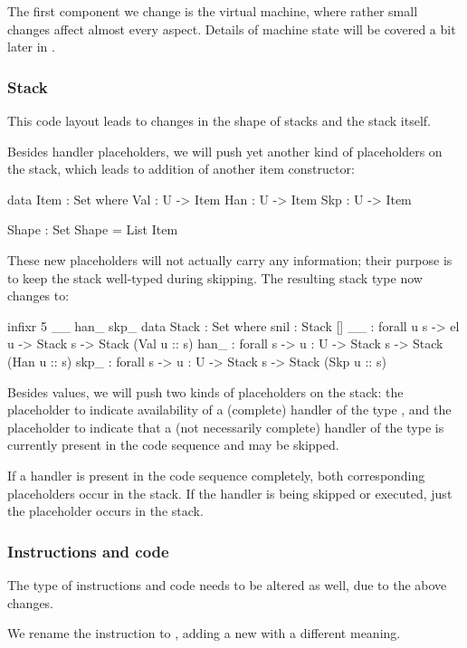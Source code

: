 The first component we change is the virtual machine, where rather small
changes affect almost every aspect. Details of machine state will be covered
a bit later in .

\subsubsection{Stack}

This code layout leads to changes in the shape of stacks and the stack itself.

Besides handler placeholders, we will push yet another kind of placeholders on
the stack, which leads to addition of another item constructor:
\begin{code}
  data Item : Set where
    Val : U -> Item
    Han : U -> Item
    Skp : U -> Item

  Shape : Set
  Shape = List Item
\end{code}
\noindent These new placeholders will not actually carry any information; their
purpose is to keep the stack well-typed during skipping. The resulting stack type
now changes to:
\begin{code}
  infixr 5 _\scons\_ han\scons\_ skp\scons\_
  data Stack : Set where
    snil : Stack []
    _\scons\_ : forall {u s} -> el u -> Stack s -> Stack (Val u :: s)
    han\scons\_ : forall {s} -> {u : U} -> Stack s -> Stack (Han u :: s)
    skp\scons\_ : forall {s} -> {u : U} -> Stack s -> Stack (Skp u :: s)
\end{code}
\noindent Besides values, we will push two kinds of placeholders on the stack:
the placeholder  to indicate availability of a (complete) handler
of the type , and the placeholder  to indicate that a
(not necessarily complete) handler of the type  is currently present
in the code sequence and may be skipped.

If a handler is present in the code sequence completely, both corresponding
placeholders occur in the stack. If the handler is being skipped or executed,
just the  placeholder occurs in the stack.

\subsubsection{Instructions and code}

The type of instructions and code needs to be altered as well, due to the above
changes.

We rename the instruction  to , adding a new
 with a different meaning.


